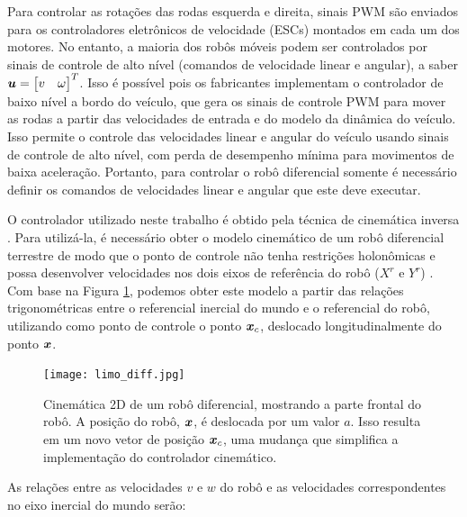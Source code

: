     Para controlar as rotações das rodas esquerda e direita, sinais PWM são enviados para os controladores eletrônicos de velocidade (ESCs) montados em cada um dos motores. No entanto, a maioria dos robôs móveis podem ser controlados por sinais de controle de alto nível (comandos de velocidade linear e angular), a saber $ \boldsymbol{u} = \begin{bmatrix} v & \omega \end{bmatrix}^T $. Isso é possível pois os fabricantes implementam o controlador de baixo nível a bordo do veículo, que gera os sinais de controle PWM para mover as rodas a partir das velocidades de entrada e do modelo da dinâmica do veículo. Isso permite o controle das velocidades linear e angular do veículo usando sinais de controle de alto nível, com perda de desempenho mínima para movimentos de baixa aceleração. Portanto, para controlar o robô diferencial somente é necessário definir os comandos de velocidades linear e angular que este deve executar.

    O controlador utilizado neste trabalho é obtido pela técnica de cinemática inversa \cite{Sarcinelli-Filho2023_4}. Para utilizá-la, é necessário obter o modelo cinemático de um robô diferencial terrestre de modo que o ponto de controle não tenha restrições holonômicas e possa desenvolver velocidades nos dois eixos de referência do robô ($X^r$ e $Y^r$) \cite{Sarcinelli-Filho2023_2}. Com base na Figura \ref{fig:differential_mode}, podemos obter este modelo a partir das relações trigonométricas entre o referencial inercial do mundo e o referencial do robô, utilizando como ponto de controle o ponto $\boldsymbol{x}_c$, deslocado longitudinalmente do ponto $\boldsymbol{x}$.
    
    \begin{figure}[htb]
        \centering
        \caption{Cinemática 2D de um robô diferencial, mostrando a parte frontal do robô. A posição do robô, $ \boldsymbol{x} $, é deslocada por um valor \( a \). Isso resulta em um novo vetor de posição \( \boldsymbol{x}_c \), uma mudança que simplifica a implementação do controlador cinemático.}
        \texttt{[image: limo\_diff.jpg]} 
        \label{fig:differential_mode}
        \source
    \end{figure}
    
    As relações entre as velocidades $v$ e $w$ do robô e as velocidades correspondentes no eixo inercial do mundo serão:
    
